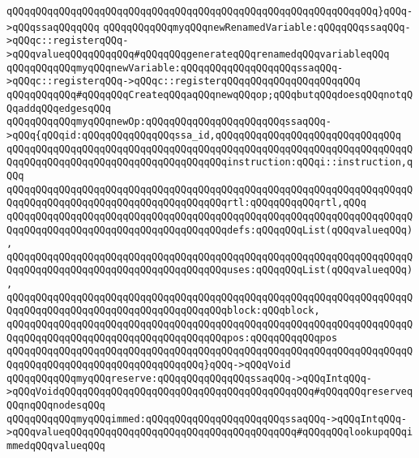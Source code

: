 \verb|qQQqqQQqqQQqqQQqqQQqqQQqqQQqqQQqqQQqqQQqqQQqqQQqqQQqqQQqqQQqqQQq}qQQq->qQQqssaqQQqqQQq|\newline
\verb|qQQqqQQqqQQqmyqQQqnewRenamedVariable:qQQqqQQqssaqQQq->qQQqc::registerqQQq->qQQqvalueqQQqqQQqqQQq#qQQqqQQqgenerateqQQqrenamedqQQqvariableqQQq|\newline
\verb|qQQqqQQqqQQqmyqQQqnewVariable:qQQqqQQqqQQqqQQqqQQqssaqQQq->qQQqc::registerqQQq->qQQqc::registerqQQqqQQqqQQqqQQqqQQqqQQq|\newline
\newline
\verb|qQQqqQQqqQQq#qQQqqQQqCreateqQQqaqQQqnewqQQqop;qQQqbutqQQqdoesqQQqnotqQQqaddqQQqedgesqQQq|\newline
\verb|qQQqqQQqqQQqmyqQQqnewOp:qQQqqQQqqQQqqQQqqQQqqQQqssaqQQq->qQQq{qQQqid:qQQqqQQqqQQqqQQqssa_id,qQQqqQQqqQQqqQQqqQQqqQQqqQQqqQQq|\newline
\verb|qQQqqQQqqQQqqQQqqQQqqQQqqQQqqQQqqQQqqQQqqQQqqQQqqQQqqQQqqQQqqQQqqQQqqQQqqQQqqQQqqQQqqQQqqQQqqQQqqQQqqQQqqQQqinstruction:qQQqi::instruction,qQQq|\newline
\verb|qQQqqQQqqQQqqQQqqQQqqQQqqQQqqQQqqQQqqQQqqQQqqQQqqQQqqQQqqQQqqQQqqQQqqQQqqQQqqQQqqQQqqQQqqQQqqQQqqQQqqQQqqQQqrtl:qQQqqQQqqQQqrtl,qQQq|\newline
\verb|qQQqqQQqqQQqqQQqqQQqqQQqqQQqqQQqqQQqqQQqqQQqqQQqqQQqqQQqqQQqqQQqqQQqqQQqqQQqqQQqqQQqqQQqqQQqqQQqqQQqqQQqqQQqdefs:qQQqqQQqList(qQQqvalueqQQq),|\newline
\verb|qQQqqQQqqQQqqQQqqQQqqQQqqQQqqQQqqQQqqQQqqQQqqQQqqQQqqQQqqQQqqQQqqQQqqQQqqQQqqQQqqQQqqQQqqQQqqQQqqQQqqQQqqQQquses:qQQqqQQqList(qQQqvalueqQQq),|\newline
\verb|qQQqqQQqqQQqqQQqqQQqqQQqqQQqqQQqqQQqqQQqqQQqqQQqqQQqqQQqqQQqqQQqqQQqqQQqqQQqqQQqqQQqqQQqqQQqqQQqqQQqqQQqqQQqblock:qQQqblock,|\newline
\verb|qQQqqQQqqQQqqQQqqQQqqQQqqQQqqQQqqQQqqQQqqQQqqQQqqQQqqQQqqQQqqQQqqQQqqQQqqQQqqQQqqQQqqQQqqQQqqQQqqQQqqQQqqQQqpos:qQQqqQQqqQQqpos|\newline
\verb|qQQqqQQqqQQqqQQqqQQqqQQqqQQqqQQqqQQqqQQqqQQqqQQqqQQqqQQqqQQqqQQqqQQqqQQqqQQqqQQqqQQqqQQqqQQqqQQqqQQqqQQq}qQQq->qQQqVoid|\newline
\verb|qQQqqQQqqQQqmyqQQqreserve:qQQqqQQqqQQqqQQqssaqQQq->qQQqIntqQQq->qQQqVoidqQQqqQQqqQQqqQQqqQQqqQQqqQQqqQQqqQQqqQQqqQQq#qQQqqQQqreserveqQQqnqQQqnodesqQQq|\newline
\verb|qQQqqQQqqQQqmyqQQqimmed:qQQqqQQqqQQqqQQqqQQqqQQqssaqQQq->qQQqIntqQQq->qQQqvalueqQQqqQQqqQQqqQQqqQQqqQQqqQQqqQQqqQQqqQQq#qQQqqQQqlookupqQQqimmedqQQqvalueqQQq|\newline
